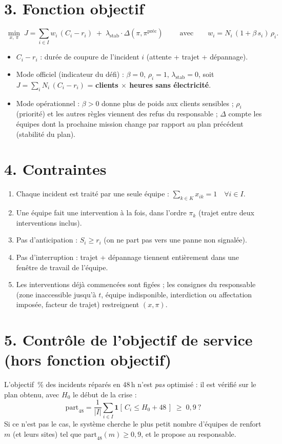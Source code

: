 \documentclass[10pt,a4paper]{article}
\begin{document}
\section*{3. Fonction objectif}
\[
\boxed{\;\min_{x,\ \pi}\; J = \sum_{i \in I} w_i\,(C_i - r_i) \;+\; \lambda_{\text{stab}} \cdot \Delta(\pi, \pi^{\text{préc}})\;}
\qquad\text{avec}\qquad w_i = N_i\,(1 + \beta\, s_i)\,\rho_i .
\]
\begin{itemize}
  \item $C_i - r_i$ : durée de coupure de l'incident $i$ (attente + trajet + dépannage).
  \item Mode officiel (indicateur du défi) : $\beta = 0$, $\rho_i = 1$, $\lambda_{\text{stab}} = 0$, soit
        $J = \sum_i N_i\,(C_i - r_i)$ = \textbf{clients $\times$ heures sans électricité}.
  \item Mode opérationnel : $\beta > 0$ donne plus de poids aux clients sensibles ; $\rho_i$ (priorité) et les autres
        règles viennent des refus du responsable ; $\Delta$ compte les équipes dont la prochaine mission change par
        rapport au plan précédent (stabilité du plan).
\end{itemize}

\section*{4. Contraintes}
\begin{enumerate}[label=(C\arabic*)]
  \item Chaque incident est traité par une seule équipe : $\sum_{k \in K} x_{ik} = 1 \quad \forall i \in I$.
  \item Une équipe fait une intervention à la fois, dans l'ordre $\pi_k$ (trajet entre deux interventions inclus).
  \item Pas d'anticipation : $S_i \ge r_i$ (on ne part pas vers une panne non signalée).
  \item Pas d'interruption : trajet + dépannage tiennent entièrement dans une fenêtre de travail de l'équipe.
  \item Les interventions déjà commencées sont figées ; les consignes du responsable (zone inaccessible jusqu'à $t$,
        équipe indisponible, interdiction ou affectation imposée, facteur de trajet) restreignent $(x, \pi)$.
\end{enumerate}

\section*{5. Contrôle de l'objectif de service (hors fonction objectif)}
L'objectif \,\% des incidents réparés en 48\,h \fg{} n'est \emph{pas} optimisé : il est vérifié sur le plan obtenu, avec $H_0$ le début de la crise :
\[
\text{part}_{48} = \frac{1}{|I|}\sum_{i \in I} \mathbf{1}\!\left[\, C_i \le H_0 + 48 \,\right] \;\ge\; 0{,}9 \ ?
\]
Si ce n'est pas le cas, le système cherche le plus petit nombre d'équipes de renfort $m$ (et leurs sites) tel que
$\text{part}_{48}(m) \ge 0{,}9$, et le propose au responsable.
\end{document}

